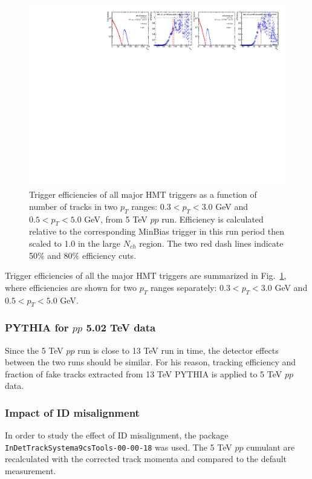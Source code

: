 \begin{figure}[H]
\centering
\includegraphics[width=1.\linewidth]{figs/sec_evtSlc/trigEff_pp5/trigEff_Trig21.pdf}
\caption{Trigger efficiencies of all major HMT triggers as a function of number of tracks in two $p_{T}$ ranges: $0.3<p_{T}<3.0$ GeV and $0.5<p_{T}<5.0$ GeV, from 5 TeV $pp$ run. Efficiency is calculated relative to the corresponding MinBias trigger in this run period then scaled to 1.0 in the large $N_{ch}$ region. The two red dash lines indicate 50$\%$ and 80$\%$ efficiency cuts.}
\label{fig:trigEff_pp5}
\end{figure}
Trigger efficiencies of all the major HMT triggers are summarized in Fig.~\ref{fig:trigEff_pp5}, where efficiencies are shown for two $p_{T}$ ranges separately: $0.3<p_{T}<3.0$ GeV and $0.5<p_{T}<5.0$ GeV.

\subsubsection{PYTHIA for $pp$ 5.02 TeV data}
Since the 5 TeV $pp$ run is close to 13 TeV run in time, the detector effects between the two runs should be similar. For his reason, tracking efficiency and fraction of fake tracks extracted from 13 TeV PYTHIA is applied to 5 TeV $pp$ data.

\subsubsection{Impact of ID misalignment}
In order to study the effect of ID misalignment, the package \verb|InDetTrackSystema9csTools-00-00-18| was used. The 5 TeV $pp$ cumulant are recalculated with the corrected track momenta and compared to the default measurement.

